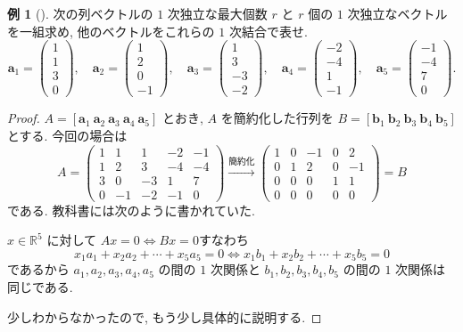 \documentclass[dvipdfmx,a4paper,11pt]{article} %
\theoremstyle{definition}
\newtheorem{eg}[thm]{例}
\begin{document}
\begin{eg}[{\cite[例題4.3.1]{M}}] 
\label{ex-M-4.3.1-1}
次の列ベクトルの \(1\) 次独立な最大個数 \(r\) と \(r\) 個の \(1\) 次独立なベクトルを一組求め, 他のベクトルをこれらの \(1\) 次結合で表せ.
\[
\bm{a}_1=
\begin{pmatrix}
1\\1\\3\\0
\end{pmatrix},
\quad
\bm{a}_2=
\begin{pmatrix}
1\\2\\0\\-1
\end{pmatrix},
\quad
\bm{a}_3=
\begin{pmatrix}
1\\3\\-3\\-2
\end{pmatrix},
\quad
\bm{a}_4=
\begin{pmatrix}
-2\\-4\\1\\-1
\end{pmatrix},
\quad
\bm{a}_5=
\begin{pmatrix}
-1\\-4\\7\\0
\end{pmatrix}.
\]
\begin{proof}
\(
A=[\bm{a}_1\ \bm{a}_2\ \bm{a}_3\ \bm{a}_4\ \bm{a}_5]
\)
とおき, \(A\) を簡約化した行列を
\(
B=[\bm{b}_1\ \bm{b}_2\ \bm{b}_3\ \bm{b}_4\ \bm{b}_5]
\)
とする. 今回の場合は
\[
A=
\begin{pmatrix}
1&1&1&-2&-1\\
1&2&3&-4&-4\\
3&0&-3&1&7\\
0&-1&-2&-1&0
\end{pmatrix}
\overset{\text{簡約化}}{\longrightarrow}
\begin{pmatrix}
1&0&-1&0&2\\
0&1&2&0&-1\\
0&0&0&1&1\\
0&0&0&0&0
\end{pmatrix}
=B
\]
である. 
教科書には次のように書かれていた. 
\begin{tcolorbox}[mybox]
\(x\in\mathbb{R}^5\) に対して
\(
Ax=0\Longleftrightarrow Bx=0
\)すなわち
\[
x_1a_1+x_2a_2+\cdots+x_5a_5=0
\Longleftrightarrow
x_1b_1+x_2b_2+\cdots+x_5b_5=0
\]
であるから
\(a_1,a_2,a_3,a_4,a_5\) の間の \(1\) 次関係と \(b_1,b_2,b_3,b_4,b_5\) の間の \(1\) 次関係は同じである. 
\end{tcolorbox}
少しわからなかったので, もう少し具体的に説明する. 


\end{proof}
\end{eg}
\end{document}
